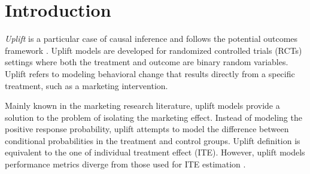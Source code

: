 \documentclass{article}
\begin{document}
\begin{abstract}
\textit{Uplift} is a particular case of individual treatment effect modeling. Such models deal with cause-and-effect inference for a specific factor, such as a marketing intervention. In practice, these models are built on customer data who purchased products or services to improve product marketing. Uplift is estimated using  either i) \textit{conditional mean regression} or ii) \textit{transformed outcome regression}. Most existing approaches are adaptations of classification and regression trees for the uplift case. However, in practice, these conventional approaches are prone to overfitting. Here we propose a new method using neural networks. This representation allows to jointly optimize the difference in conditional means and the transformed outcome losses. As a consequence, the model not only estimates the uplift, but also ensures consistency in predicting the outcome. We focus on fully randomized experiments, which is the case of our data. We show our proposed method improves the state-of-the-art on synthetic and real data.

\end{abstract}

\section{Introduction}
\label{introduction}

\textit{Uplift} is a particular case of causal inference and follows the potential outcomes framework \citep{rubin1974estimating, holland1986statistics}. Uplift models are developed for randomized controlled trials (RCTs) settings where both the treatment and outcome are binary random variables. Uplift refers to modeling behavioral change that results directly from a specific treatment, such as a marketing intervention. %

Mainly known in the marketing research literature, uplift models \citep{radcliffe1999differential, hansotia2002direct, lo2002true, radcliffe2007using} provide a solution to the problem of isolating the marketing effect. Instead of modeling the positive response probability, uplift attempts to model the difference between conditional probabilities in the treatment and control groups. Uplift definition is equivalent to the one of individual treatment effect (ITE). However, uplift models performance metrics diverge from those used for ITE estimation \citep{radcliffe2011real}. 
\end{document}
